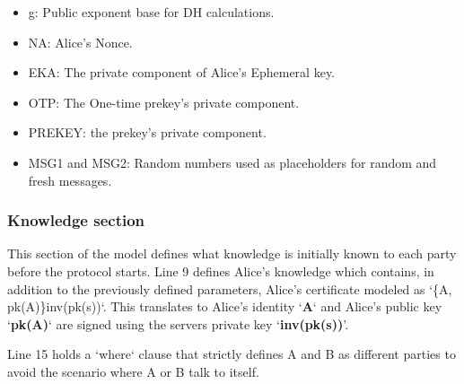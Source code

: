 \begin{itemize}\setlength\itemsep{-0.3em}
	\item g: Public exponent base for DH calculations.
	\item NA: Alice's Nonce.
	\item EKA: The private component of Alice's Ephemeral key.
	\item OTP: The One-time prekey's private component.
	\item PREKEY: the prekey's private component.
	\item MSG1 and MSG2: Random numbers used as placeholders for random and fresh messages.
\end{itemize}

\subsubsection{Knowledge section}
This section of the model defines what knowledge is initially known to each party before the protocol starts. Line 9 defines Alice's knowledge which contains, in addition to the previously defined parameters, Alice's certificate modeled as `\{A, pk(A)\}inv(pk(s))`. This translates to Alice's identity `\textbf{A}` and Alice's public key `\textbf{pk(A)}` are signed using the servers private key `\textbf{inv(pk(s))}'. 

Line 15 holds a `where` clause that strictly defines A and B as different parties to avoid the scenario where A or B talk to itself.
